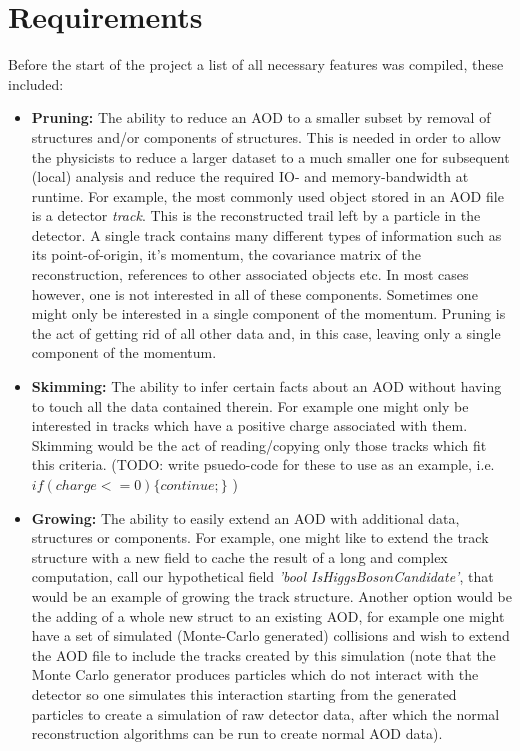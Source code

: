 \documentclass[a4paper]{report}
\begin{document}
\section{Requirements}
Before the start of the project a list of all necessary features was compiled, these included:
\begin{itemize}
  \item {\bf Pruning:} The ability to reduce an AOD to a smaller subset by removal of structures and/or components of structures. This is needed in order to allow
  the physicists to reduce a larger dataset to a much smaller one for subsequent (local) analysis and reduce the required IO- and memory-bandwidth at runtime. For example,
  the most commonly used object stored in an AOD file is a detector {\em track}. This is the reconstructed trail left by a particle in the detector. A single track contains
  many different types of information such as its point-of-origin, it's momentum, the covariance matrix of the reconstruction, references to other associated objects etc.
  In most cases however, one is not interested in all of these components. Sometimes one might only be interested in a single component of the momentum.
  Pruning is the act of getting rid of all other data and, in this case, leaving only a single component of the momentum.
  \item {\bf Skimming:} The ability to infer certain facts about an AOD without having to touch all the data contained therein.
   For example one might only be interested in tracks which have a positive charge associated with them. Skimming would be the act of reading/copying only those
  tracks which fit this criteria.
  (TODO: write psuedo-code for these to use as an example, i.e. $if(charge <= 0)\{ continue; \}$ )
  \item {\bf Growing:} The ability to easily extend an AOD with additional data, structures or components. For example, one might like to extend the track structure with a
  new field to cache the result of a long and complex computation, call our hypothetical field {\em 'bool IsHiggsBosonCandidate'}, that would be an example of growing the track structure.
   Another option would be the adding of a whole new struct to an existing AOD, for example one might have a set of simulated (Monte-Carlo generated) collisions and wish to
   extend the AOD file to include the tracks created by this simulation (note that the Monte Carlo generator produces particles which do not interact with the detector so one simulates this interaction
   starting from the generated particles to create a simulation of raw detector data, after which the normal reconstruction algorithms can be run to create normal AOD data).
\end{itemize}
\end{document}
